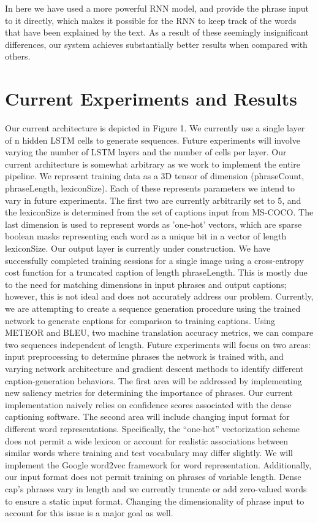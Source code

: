 \documentclass[11pt]{article}
\begin{document}
In here we have used a more powerful RNN model, and provide the phrase input to it directly, which makes it possible for the RNN to keep track of the words that have been explained by the text. As a result of these seemingly insignificant differences, our system achieves substantially better results when compared with others.

\section{Current Experiments and Results}
Our current architecture is depicted in Figure 1. We currently use a single layer of n hidden LSTM cells to generate sequences. Future experiments will involve varying the number of LSTM layers and the number of cells per layer. Our current architecture is somewhat arbitrary as we work to implement the entire pipeline. 
We represent training data as a 3D tensor of dimension (phraseCount, phraseLength, lexiconSize). Each of these represents parameters we intend to vary in future experiments. The first two are currently arbitrarily set to 5, and the lexiconSize is determined from the set of captions input from MS-COCO. The last dimension is used to represent words as 'one-hot' vectors, which are sparse boolean masks representing each word as a unique bit in a vector of length lexiconSize. 
Our output layer is currently under construction. We have successfully completed training sessions for a single image using a cross-entropy cost function for a truncated caption of length phraseLength. This is mostly due to the need for matching dimensions in input phrases and output captions; however, this is not ideal and does not accurately address our problem. Currently, we are attempting to create a sequence generation procedure using the trained network to generate captions for comparison to training captions. Using METEOR and BLEU, two machine translation accuracy metrics, we can compare two sequences independent of length. 
Future experiments will focus on two areas: input preprocessing to determine phrases the network is trained with, and varying network architecture and gradient descent methods to identify different caption-generation behaviors. 
The first area will be addressed by implementing new saliency metrics for determining the importance of phrases. Our current implementation naively relies on confidence scores associated with the dense captioning software.
The second area will include changing input format for different word representations. Specifically, the “one-hot” vectorization scheme does not permit a wide lexicon or account for realistic associations between similar words where training and test vocabulary may differ slightly. We will implement the Google word2vec framework for word representation. Additionally, our input format does not permit training on phrases of variable length. Dense cap's phrases vary in length and we currently truncate or add zero-valued words to ensure a static input format. Changing the dimensionality of phrase input to account for this issue is a major goal as well.
\end{document}

